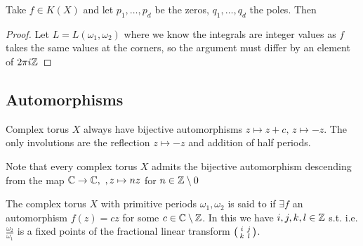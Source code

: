 \documentclass{article}
\begin{document}
\begin{prop}
Take $f \in K(X)$ and let $p_1, \dots, p_d$ be the zeros, $q_1, \dots, q_d$ the poles. Then 
\end{prop}
\begin{proof}
Let $L = L(\omega_1, \omega_2)$
where we know the integrals are integer values as $f$ takes the same values at the corners, so the argument must differ by an element of $2\pi i \mathbb{Z}$
\end{proof}

\subsection{Automorphisms}

\begin{prop}
	Complex torus $X$ always have bijective automorphisms $z \mapsto z+c, \, z \mapsto -z$. The only involutions are the reflection $z \mapsto -z$ and addition of half periods. 
\end{prop}

\begin{remark}
	Note that every complex torus $X$ admits the bijective automorphism descending from the map $\mathbb{C} \to \mathbb{C}, \ ,z \mapsto n z$ for $n \in \mathbb{Z}\setminus 0$
\end{remark}

\begin{definition}
	The complex torus $X$ with primitive periods $\omega_1, \omega_2$ is said to  if $\exists f$ an automorphism $f(z) = cz$ for some $c \in \mathbb{C}\setminus\mathbb{Z}$. In this we have $i,j,k,l \in \mathbb{Z}$ s.t.
i.e. $\frac{\omega_2}{\omega_1}$ is a fixed points of the fractional linear transform $\begin{psmallmatrix} i & j \\ k & l \end{psmallmatrix}$. 
\end{definition}
\end{document}
